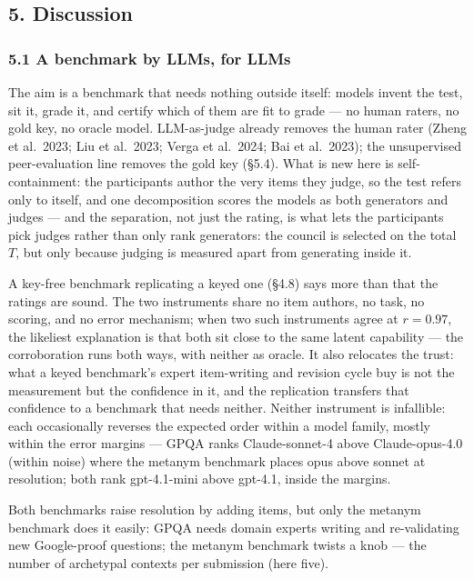 \subsection{5. Discussion}\label{discussion}

\subsubsection{5.1 A benchmark by LLMs, for LLMs}\label{a-benchmark-by-llms-for-llms}

The aim is a benchmark that needs nothing outside itself: models invent the test, sit it, grade it, and certify which of them are fit to grade --- no human raters, no gold key, no oracle model. LLM-as-judge already removes the human rater (Zheng et al.~2023; Liu et al.~2023; Verga et al.~2024; Bai et al.~2023); the unsupervised peer-evaluation line removes the gold key (§5.4). What is new here is self-containment: the participants author the very items they judge, so the test refers only to itself, and one decomposition scores the models as both generators and judges --- and the separation, not just the rating, is what lets the participants pick judges rather than only rank generators: the council is selected on the total \(T\), but only because judging is measured apart from generating inside it.

A key-free benchmark replicating a keyed one (§4.8) says more than that the ratings are sound. The two instruments share no item authors, no task, no scoring, and no error mechanism; when two such instruments agree at \(r = 0.97\), the likeliest explanation is that both sit close to the same latent capability --- the corroboration runs both ways, with neither as oracle. It also relocates the trust: what a keyed benchmark's expert item-writing and revision cycle buy is not the measurement but the confidence in it, and the replication transfers that confidence to a benchmark that needs neither. Neither instrument is infallible: each occasionally reverses the expected order within a model family, mostly within the error margins --- GPQA ranks Claude-sonnet-4 above Claude-opus-4.0 (within noise) where the metanym benchmark places opus above sonnet at resolution; both rank gpt-4.1-mini above gpt-4.1, inside the margins.

Both benchmarks raise resolution by adding items, but only the metanym benchmark does it easily: GPQA needs domain experts writing and re-validating new Google-proof questions; the metanym benchmark twists a knob --- the number of archetypal contexts per submission (here five).

